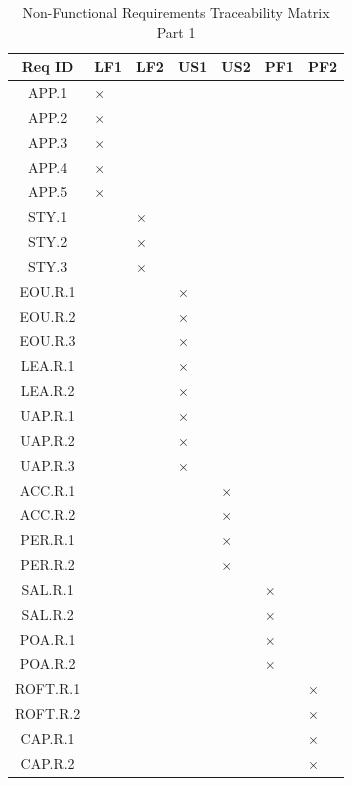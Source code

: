 \documentclass[12pt]{article}
\begin{document}
\begin{table}[htbp]
\centering
\small
\caption{Non-Functional Requirements Traceability Matrix Part 1}
\label{tab:nfr-trace-a}
\begin{tabularx}{\textwidth}{|c|*{6}{>{\centering\arraybackslash}X|}}
\hline
Req ID & LF1 & LF2 & US1 & US2 & PF1 & PF2 \\
\hline
APP.1 & $\times$ & & & & & \\
\hline
APP.2 & $\times$ & & & & & \\
\hline
APP.3 & $\times$ & & & & & \\
\hline
APP.4 & $\times$ & & & & & \\
\hline
APP.5 & $\times$ & & & & & \\
\hline
STY.1 & & $\times$ & & & & \\
\hline
STY.2 & & $\times$ & & & & \\
\hline
STY.3 & & $\times$ & & & & \\
\hline
EOU.R.1 & & & $\times$ & & & \\
\hline
EOU.R.2 & & & $\times$ & & & \\
\hline
EOU.R.3 & & & $\times$ & & & \\
\hline
LEA.R.1 & & & $\times$ & & & \\
\hline
LEA.R.2 & & & $\times$ & & & \\
\hline
UAP.R.1 & & & $\times$ & & & \\
\hline
UAP.R.2 & & & $\times$ & & & \\
\hline
UAP.R.3 & & & $\times$ & & & \\
\hline
ACC.R.1 & & & & $\times$ & & \\
\hline
ACC.R.2 & & & & $\times$ & & \\
\hline
PER.R.1 & & & & $\times$ & & \\
\hline
PER.R.2 & & & & $\times$ & & \\
\hline
SAL.R.1 & & & & & $\times$ & \\
\hline
SAL.R.2 & & & & & $\times$ & \\
\hline
POA.R.1 & & & & & $\times$ & \\
\hline
POA.R.2 & & & & & $\times$ & \\
\hline
ROFT.R.1 & & & & & & $\times$ \\
\hline
ROFT.R.2 & & & & & & $\times$ \\
\hline
CAP.R.1 & & & & & & $\times$ \\
\hline
CAP.R.2 & & & & & & $\times$ \\
\hline
\end{tabularx}
\end{table}
\end{document}
